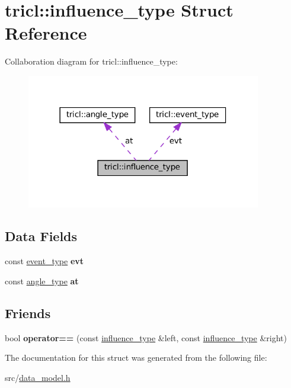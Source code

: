 \hypertarget{structtricl_1_1influence__type}{}\section{tricl\+:\+:influence\+\_\+type Struct Reference}
\label{structtricl_1_1influence__type}


Collaboration diagram for tricl\+:\+:influence\+\_\+type\+:
\nopagebreak
\begin{figure}[H]
\begin{center}
\leavevmode
\includegraphics[width=290pt]{d0/dba/structtricl_1_1influence__type__coll__graph}
\end{center}
\end{figure}
\subsection*{Data Fields}
\begin{DoxyCompactItemize}
\item 
\mbox{\label{structtricl_1_1influence__type_a9e3a80224b266e0ff8041644e372fe19}} 
const \hyperlink{structtricl_1_1event__type}{event\+\_\+type} {\bfseries evt}
\item 
\mbox{\label{structtricl_1_1influence__type_a9d6fecd13fbb3e7b0686556d80b3b537}} 
const \hyperlink{structtricl_1_1angle__type}{angle\+\_\+type} {\bfseries at}
\end{DoxyCompactItemize}
\subsection*{Friends}
\begin{DoxyCompactItemize}
\item 
\mbox{\label{structtricl_1_1influence__type_a4f5b42686b09f580c15f8fa9f3aa296f}} 
bool {\bfseries operator==} (const \hyperlink{structtricl_1_1influence__type}{influence\+\_\+type} \&left, const \hyperlink{structtricl_1_1influence__type}{influence\+\_\+type} \&right)
\end{DoxyCompactItemize}


The documentation for this struct was generated from the following file\+:\begin{DoxyCompactItemize}
\item 
src/\hyperlink{data__model_8h}{data\+\_\+model.\+h}\end{DoxyCompactItemize}
